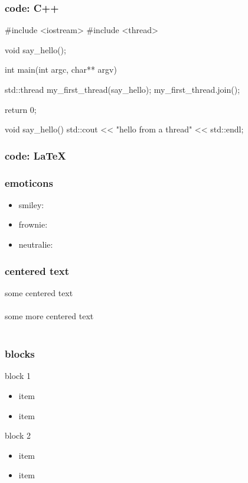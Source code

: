 \begin{frame}[fragile]
\frametitle{code: C++}
\begin{cpp}
#include <iostream>
#include <thread>

void say_hello();

int main(int argc, char** argv){

    std::thread my_first_thread(say_hello);
    my_first_thread.join();

    return 0;
}

void say_hello(){
    std::cout << "hello from a thread" << std::endl;
}
\end{cpp}
\end{frame}

\begin{frame}[fragile]
\frametitle{code: \LaTeX}
\end{frame}

\begin{frame}
\frametitle{emoticons}
\begin{itemize}
\item smiley: \smiley
\item frownie: \frownie
\item neutralie: \neutralie
\end{itemize}
\end{frame}

\begin{frame}
\frametitle{centered text}
\begin{center}
some centered text\\\mbox{}\\some more centered text\\\mbox{}\\
\end{center}
\end{frame}

\begin{frame}
\frametitle{blocks}
\begin{block}{block 1}
\begin{itemize}
\item item
\item item
\end{itemize}
\end{block}
\begin{block}{block 2}
\begin{itemize}
\item item
\item item
\end{itemize}
\end{block}
\end{frame}

